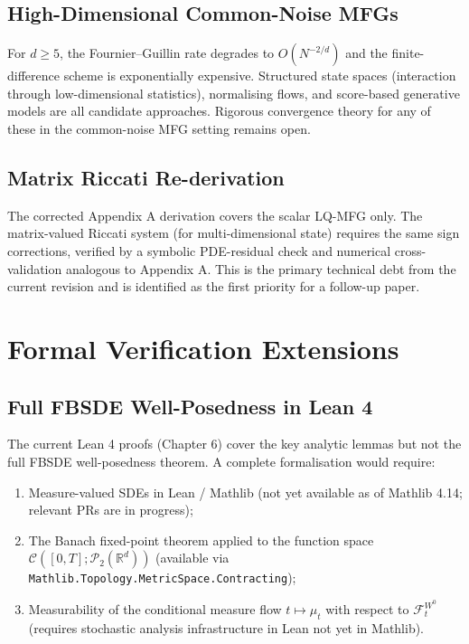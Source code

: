 \subsection{High-Dimensional Common-Noise MFGs}

For $d \ge 5$, the Fournier--Guillin rate degrades to $O(N^{-2/d})$ and the
finite-difference scheme is exponentially expensive. Structured state spaces
(interaction through low-dimensional statistics), normalising flows, and
score-based generative models are all candidate approaches. Rigorous convergence
theory for any of these in the common-noise MFG setting remains open.

\subsection{Matrix Riccati Re-derivation}

The corrected Appendix A derivation covers the scalar LQ-MFG only. The
matrix-valued Riccati system (for multi-dimensional state) requires the same
sign corrections, verified by a symbolic PDE-residual check and numerical
cross-validation analogous to Appendix A. This is the primary technical debt
from the current revision and is identified as the first priority for a follow-up
paper.

\section{Formal Verification Extensions}
\label{sec:fut-lean}

\subsection{Full FBSDE Well-Posedness in Lean 4}

The current Lean 4 proofs (Chapter 6) cover the key analytic lemmas but not the
full FBSDE well-posedness theorem. A complete formalisation would require:
\begin{enumerate}
    \item Measure-valued SDEs in Lean / Mathlib (not yet available as of Mathlib
    4.14; relevant PRs are in progress);
    \item The Banach fixed-point theorem applied to the function space
    $\mathcal{C}([0,T]; \mathcal{P}_2(\mathbb{R}^d))$ (available via
    \texttt{Mathlib.Topology.MetricSpace.Contracting});
    \item Measurability of the conditional measure flow $t \mapsto \mu_t$ with
    respect to $\mathcal{F}_t^{W^0}$ (requires stochastic analysis infrastructure
    in Lean not yet in Mathlib).
\end{enumerate}

